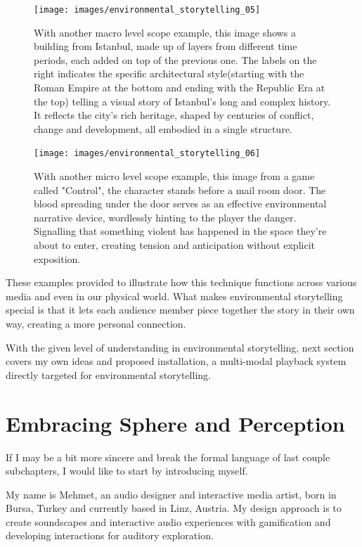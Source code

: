     \begin{figure}[H]
    \centering
    \texttt{[image: images/environmental\_storytelling\_05]}
    \caption{With another macro level scope example, this image shows a building from Istanbul, made up of layers from different time periods, each added on top of the previous one. The labels on the right indicates the specific architectural style(starting with the Roman Empire at the bottom and ending with the Republic Era at the top) telling a visual story of Istanbul’s long and complex history. It reflects the city’s rich heritage, shaped by centuries of conflict, change and development, all embodied in a single structure.}
    \end{figure}

    \begin{figure}[H]
    \centering
    \texttt{[image: images/environmental\_storytelling\_06]}
    \caption{With another micro level scope example, this image from a game called "Control", the character stands before a mail room door. The blood spreading under the door serves as an effective environmental narrative device, wordlessly hinting to the player the danger. Signalling that something violent has happened in the space they're about to enter, creating tension and anticipation without explicit exposition.}
    \end{figure}

    These examples provided to illustrate how this technique functions across various media and even in our physical world. What makes environmental storytelling special is that it lets each audience member piece together the story in their own way, creating a more personal connection.

    With the given level of understanding in environmental storytelling, next section covers my own ideas and proposed installation, a multi-modal playback system directly targeted for environmental storytelling.
    \section{Embracing Sphere and Perception} 
    If I may be a bit more sincere and break the formal language of last couple subchapters, I would like to start by introducing myself. 
    
    My name is Mehmet, an audio designer and interactive media artist, born in Bursa, Turkey and currently based in Linz, Austria. My design approach is to create soundscapes and interactive audio experiences with gamification and developing interactions for auditory exploration.

